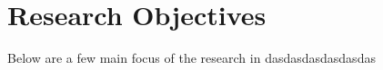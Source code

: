 \renewcommand{\baselinestretch}{1.5}\normalsize

\chapter{Research Objectives}



\label{Chapter Research Objectives}

Below are a few main focus of the research in dasdasdasdasdasdas